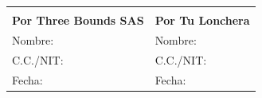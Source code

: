 \documentclass[11pt,a4paper]{article}
\begin{document}
\vspace{1.1cm}
\nopagebreak
\noindent
\begin{tabularx}{\textwidth}{XX}
\underline{\hspace{6cm}} & \underline{\hspace{6cm}} \\[2pt]
\sffamily\bfseries Por Three Bounds SAS & \sffamily\bfseries Por Tu Lonchera \\[10pt]
Nombre: \underline{\hspace{4.2cm}} & Nombre: \underline{\hspace{4.2cm}} \\[10pt]
C.C./NIT: \underline{\hspace{3.9cm}} & C.C./NIT: \underline{\hspace{3.9cm}} \\[10pt]
Fecha: \underline{\hspace{4.6cm}} & Fecha: \underline{\hspace{4.6cm}} \\
\end{tabularx}
\end{document}
